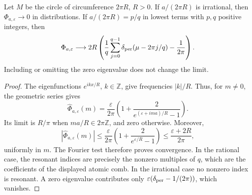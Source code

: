 \begin{proposition}\ours\quad
Let \(M\) be the circle of circumference \(2\pi R\), \(R>0\).
If \(a/(2\pi R)\) is irrational, then
\(\Phi_{a,\varepsilon}\to0\) in distributions. If
\(a/(2\pi R)=p/q\) in lowest terms with \(p,q\) positive integers, then
\[
 \Phi_{a,\varepsilon}\longrightarrow
 2R\left(\frac1q\sum_{j=0}^{q-1}
           \delta_{\rm per}(\mu-2\pi j/q)-\frac1{2\pi}\right).
\]
Including or omitting the zero eigenvalue does not change the limit.
\end{proposition}
\begin{proof}
The eigenfunctions \(e^{ikx/R}\), \(k\in\mathbb Z\), give frequencies
\(|k|/R\). Thus, for \(m\ne0\), the geometric series gives
\[
 \widehat\Phi_{a,\varepsilon}(m)
 =\frac{\varepsilon}{2\pi}
 \left(1+\frac{2}{e^{(\varepsilon+ima)/R}-1}\right).
\]
Its limit is \(R/\pi\) when \(ma/R\in2\pi\mathbb Z\), and zero
otherwise. Moreover,
\[
 \left|\widehat\Phi_{a,\varepsilon}(m)\right|
 \leq\frac{\varepsilon}{2\pi}
       \left(1+\frac{2}{e^{\varepsilon/R}-1}\right)
 \leq\frac{\varepsilon+2R}{2\pi},
\]
uniformly in \(m\). The Fourier test therefore proves convergence.
In the rational case, the resonant indices are precisely the nonzero
multiples of \(q\), which are the coefficients of the displayed atomic
comb. In the irrational case no nonzero index is resonant. A zero
eigenvalue contributes only
\(\varepsilon(\delta_{\rm per}-1/(2\pi))\), which vanishes.
\end{proof}


